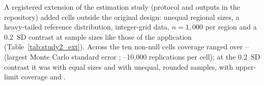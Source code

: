 \documentclass[AMA,Times1COL]{WileyNJDv5}
\begin{document}
A registered extension of the estimation study (protocol and outputs in the repository) added cells outside the original design: unequal regional sizes, a heavy-tailed reference distribution, integer-grid data, $n = 1{,}000$ per region and a 0.2~SD contrast at sample sizes like those of the application (Table~\ref{tab:study2_ext}). Across the ten non-null cells coverage ranged over -- (largest Monte Carlo standard error ; --10{,}000 replications per cell); at the 0.2~SD contrast it was  with equal sizes and  with unequal, rounded samples, with upper-limit coverage  and .
\end{document}
